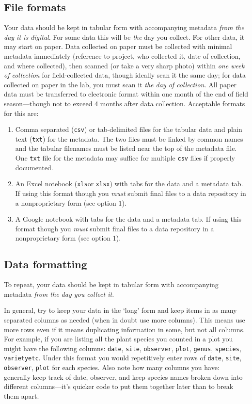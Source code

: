 \documentclass[11pt,a4paper,oneside]{article}
\begin{document}
\subsection{File formats}
Your data should be kept in tabular form with accompanying metadata \emph{from the day it is digital}. For some data this will be \emph{the} day you collect. For other data, it may start on paper. Data collected on paper must be collected with minimal metadata immediately (reference to project, who collected it, date of collection, and where collected), then scanned (or take a very sharp photo) within \emph{one week of collection} for field-collected data, though ideally scan it the same day; for data collected on paper in the lab, you must scan it \emph{the day of collection.}  All paper data must be transferred to electronic format within one month of the end of field season---though not to exceed 4 months after data collection. Acceptable formats for this are:
\begin{enumerate}
\item Comma separated (\verb|csv|) or tab-delimited files for the tabular data and plain text (\verb|txt|) for the metadata. The two files must be linked by common names and the tabular filenames must be listed near the top of the metadata file. One \verb|txt| file for the metadata may suffice for multiple \verb|csv| files if properly documented.
\item An Excel notebook (\verb|xls|or \verb|xlsx|) with tabs for the data and a metadata tab. If using this format though you \emph{must} submit final files to a data repository in a nonproprietary form (see option 1).
\item A Google notebook with tabs for the data and a metadata tab. If using this format though you \emph{must} submit final files to a data repository in a nonproprietary form (see option 1).
\end{enumerate}

\subsection{Data formatting}
To repeat, your data should be kept in tabular form with accompanying metadata \emph{from the day you collect it.} 

In general, try to keep your data in the `long' form and keep items in as many separated columns as needed (when in doubt use more columns). This means use more rows even if it means duplicating information in some, but not all columns. For example, if you are listing all the plant species you counted in a plot you might have the following columns: \verb|date|, \verb|site|, \verb|observer|, \verb|plot|, \verb|genus|, \verb|species|, \verb|varietyetc|. Under this format you would repetitively enter rows of \verb|date|, \verb|site|, \verb|observer|, \verb|plot| for each species. Also note how many columns you have: generally keep track of date, observer, and keep species names broken down into different columns---it's quicker code to put them together later than to break them apart. 
\end{document}
